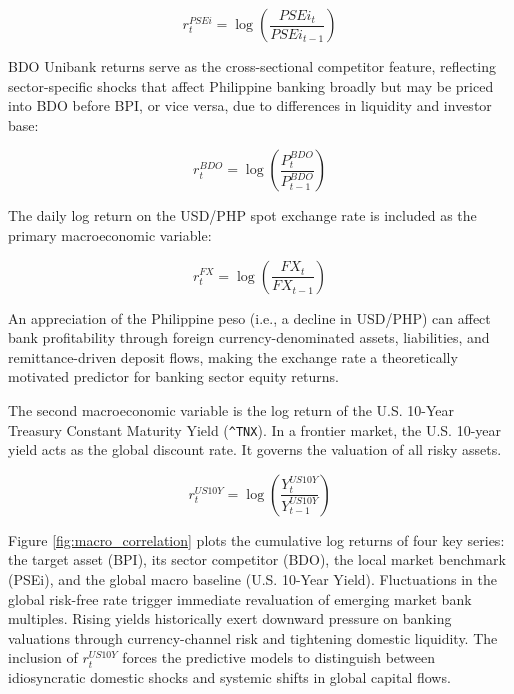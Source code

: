 \documentclass[12pt]{article}
\begin{document}
\begin{equation}
    r^{PSEi}_t = \log\!\left(\frac{PSEi_t}{PSEi_{t-1}}\right)
\end{equation}

BDO Unibank returns serve as the cross-sectional competitor feature, reflecting sector-specific shocks that affect Philippine banking broadly but may be priced into BDO before BPI, or vice versa, due to differences in liquidity and investor base:

\begin{equation}
    r^{BDO}_t = \log\!\left(\frac{P^{BDO}_t}{P^{BDO}_{t-1}}\right)
\end{equation}

The daily log return on the USD/PHP spot exchange rate is included as the primary macroeconomic variable:

\begin{equation}
    r^{FX}_t = \log\!\left(\frac{FX_t}{FX_{t-1}}\right)
\end{equation}

An appreciation of the Philippine peso (i.e., a decline in USD/PHP) can affect bank profitability through foreign currency-denominated assets, liabilities, and remittance-driven deposit flows, making the exchange rate a theoretically motivated predictor for banking sector equity returns.

The second macroeconomic variable is the log return of the U.S. 10-Year Treasury Constant Maturity Yield (\texttt{\textasciicircum TNX}). In a frontier market, the U.S. 10-year yield acts as the global discount rate. It governs the valuation of all risky assets.

\begin{equation}
    r^{US10Y}_t = \log\!\left(\frac{Y^{US10Y}_t}{Y^{US10Y}_{t-1}}\right)
\end{equation}

Figure \ref{fig:macro_correlation} plots the cumulative log returns of four key series: the target asset (BPI), its sector competitor (BDO), the local market benchmark (PSEi), and the global macro baseline (U.S. 10-Year Yield). Fluctuations in the global risk-free rate trigger immediate revaluation of emerging market bank multiples. Rising yields historically exert downward pressure on banking valuations through currency-channel risk and tightening domestic liquidity. The inclusion of $r^{US10Y}_t$ forces the predictive models to distinguish between idiosyncratic domestic shocks and systemic shifts in global capital flows.
\end{document}
